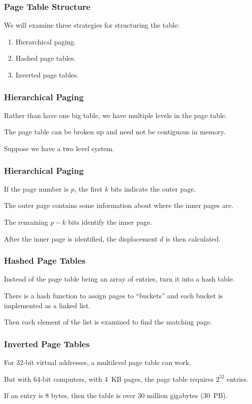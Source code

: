 \begin{frame}
\frametitle{Page Table Structure}

We will examine three strategies for structuring the table:

\begin{enumerate}
	\item Hierarchical paging.
	\item Hashed page tables.
	\item Inverted page tables.
\end{enumerate}

\end{frame}

\begin{frame}
\frametitle{Hierarchical Paging}

Rather than have one big table, we have multiple levels in the page table. 

The page table can be broken up and need not be contiguous in memory. 

Suppose we have a two level system. 

\end{frame}

\begin{frame}
\frametitle{Hierarchical Paging}

If the page number is $p$, the first $k$ bits indicate the \alert{outer page}. 

The outer page contains some information about where the \alert{inner pages} are. 

The remaining $p-k$ bits identify the inner page. 

After the inner page is identified, the displacement $d$ is then calculated.


\end{frame}



\begin{frame}
\frametitle{Hashed Page Tables}

Instead of the page table being an array of entries, turn it into a hash table.

There is a hash function to assign pages to ``buckets'' and each bucket is implemented as a linked list. 
 
Then each element of the list is examined to find the matching page.

\end{frame}

\begin{frame}
\frametitle{Inverted Page Tables}

For 32-bit virtual addresses, a multilevel page table can work. 

But with 64-bit computers, with 4~KB pages, the page table requires $2^{52}$ entries.

If an entry is 8 bytes, then the table is over 30 million gigabytes (30~PB).

\end{frame}

